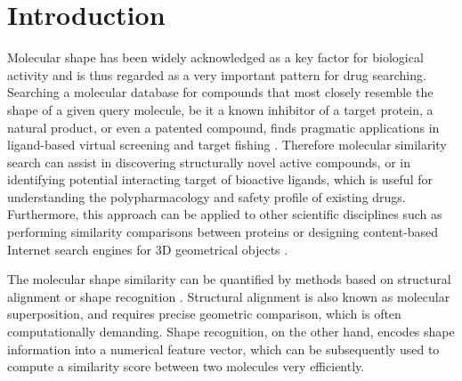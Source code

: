\documentclass[a4,center,fleqn]{NAR}
\begin{document}
\enlargethispage{-65.1pt}

\section{Introduction}

Molecular shape has been widely acknowledged as a key factor for biological activity and is thus regarded as a very important pattern for drug searching. Searching a molecular database for compounds that most closely resemble the shape of a given query molecule, be it a known inhibitor of a target protein, a natural product, or even a patented compound, finds pragmatic applications in ligand-based virtual screening \cite{1332,1380,1281,1504,1502,1615} and target fishing \cite{1528,1407,1408,1402}. Therefore molecular similarity search can assist in discovering structurally novel active compounds, or in identifying potential interacting target of bioactive ligands, which is useful for understanding the polypharmacology and safety profile of existing drugs. Furthermore, this approach can be applied to other scientific disciplines such as performing similarity comparisons between proteins or designing content-based Internet search engines for 3D geometrical objects \cite{1280}.

The molecular shape similarity can be quantified by methods based on structural alignment \cite{1440,887,1439,1534} or shape recognition \cite{1379,1338,1331}. Structural alignment is also known as molecular superposition, and requires precise geometric comparison, which is often computationally demanding. Shape recognition, on the other hand, encodes shape information into a numerical feature vector, which can be subsequently used to compute a similarity score between two molecules very efficiently.
\end{document}
